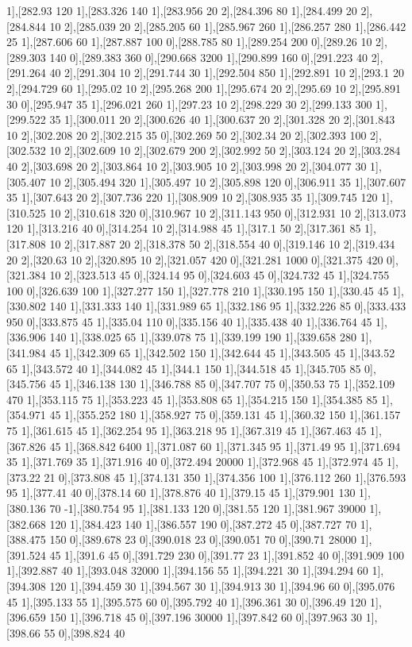 {1],[282.93 120 1],[283.326 140 1],[283.956 20 2],[284.396 80 1],[284.499 20 2],[284.844 10 2],[285.039 20 2],[285.205 60 1],[285.967 260 1],[286.257 280 1],[286.442 25 1],[287.606 60 1],[287.887 100 0],[288.785 80 1],[289.254 200 0],[289.26 10 2],[289.303 140 0],[289.383 360 0],[290.668 3200 1],[290.899 160 0],[291.223 40 2],[291.264 40 2],[291.304 10 2],[291.744 30 1],[292.504 850 1],[292.891 10 2],[293.1 20 2],[294.729 60 1],[295.02 10 2],[295.268 200 1],[295.674 20 2],[295.69 10 2],[295.891 30 0],[295.947 35 1],[296.021 260 1],[297.23 10 2],[298.229 30 2],[299.133 300 1],[299.522 35 1],[300.011 20 2],[300.626 40 1],[300.637 20 2],[301.328 20 2],[301.843 10 2],[302.208 20 2],[302.215 35 0],[302.269 50 2],[302.34 20 2],[302.393 100 2],[302.532 10 2],[302.609 10 2],[302.679 200 2],[302.992 50 2],[303.124 20 2],[303.284 40 2],[303.698 20 2],[303.864 10 2],[303.905 10 2],[303.998 20 2],[304.077 30 1],[305.407 10 2],[305.494 320 1],[305.497 10 2],[305.898 120 0],[306.911 35 1],[307.607 35 1],[307.643 20 2],[307.736 220 1],[308.909 10 2],[308.935 35 1],[309.745 120 1],[310.525 10 2],[310.618 320 0],[310.967 10 2],[311.143 950 0],[312.931 10 2],[313.073 120 1],[313.216 40 0],[314.254 10 2],[314.988 45 1],[317.1 50 2],[317.361 85 1],[317.808 10 2],[317.887 20 2],[318.378 50 2],[318.554 40 0],[319.146 10 2],[319.434 20 2],[320.63 10 2],[320.895 10 2],[321.057 420 0],[321.281 1000 0],[321.375 420 0],[321.384 10 2],[323.513 45 0],[324.14 95 0],[324.603 45 0],[324.732 45 1],[324.755 100 0],[326.639 100 1],[327.277 150 1],[327.778 210 1],[330.195 150 1],[330.45 45 1],[330.802 140 1],[331.333 140 1],[331.989 65 1],[332.186 95 1],[332.226 85 0],[333.433 950 0],[333.875 45 1],[335.04 110 0],[335.156 40 1],[335.438 40 1],[336.764 45 1],[336.906 140 1],[338.025 65 1],[339.078 75 1],[339.199 190 1],[339.658 280 1],[341.984 45 1],[342.309 65 1],[342.502 150 1],[342.644 45 1],[343.505 45 1],[343.52 65 1],[343.572 40 1],[344.082 45 1],[344.1 150 1],[344.518 45 1],[345.705 85 0],[345.756 45 1],[346.138 130 1],[346.788 85 0],[347.707 75 0],[350.53 75 1],[352.109 470 1],[353.115 75 1],[353.223 45 1],[353.808 65 1],[354.215 150 1],[354.385 85 1],[354.971 45 1],[355.252 180 1],[358.927 75 0],[359.131 45 1],[360.32 150 1],[361.157 75 1],[361.615 45 1],[362.254 95 1],[363.218 95 1],[367.319 45 1],[367.463 45 1],[367.826 45 1],[368.842 6400 1],[371.087 60 1],[371.345 95 1],[371.49 95 1],[371.694 35 1],[371.769 35 1],[371.916 40 0],[372.494 20000 1],[372.968 45 1],[372.974 45 1],[373.22 21 0],[373.808 45 1],[374.131 350 1],[374.356 100 1],[376.112 260 1],[376.593 95 1],[377.41 40 0],[378.14 60 1],[378.876 40 1],[379.15 45 1],[379.901 130 1],[380.136 70 -1],[380.754 95 1],[381.133 120 0],[381.55 120 1],[381.967 39000 1],[382.668 120 1],[384.423 140 1],[386.557 190 0],[387.272 45 0],[387.727 70 1],[388.475 150 0],[389.678 23 0],[390.018 23 0],[390.051 70 0],[390.71 28000 1],[391.524 45 1],[391.6 45 0],[391.729 230 0],[391.77 23 1],[391.852 40 0],[391.909 100 1],[392.887 40 1],[393.048 32000 1],[394.156 55 1],[394.221 30 1],[394.294 60 1],[394.308 120 1],[394.459 30 1],[394.567 30 1],[394.913 30 1],[394.96 60 0],[395.076 45 1],[395.133 55 1],[395.575 60 0],[395.792 40 1],[396.361 30 0],[396.49 120 1],[396.659 150 1],[396.718 45 0],[397.196 30000 1],[397.842 60 0],[397.963 30 1],[398.66 55 0],[398.824 40 }
